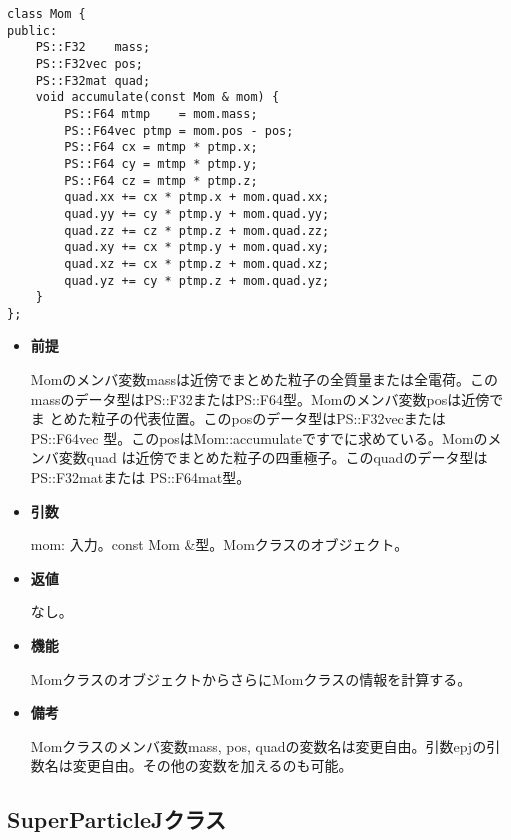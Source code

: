 \begin{screen}
\begin{verbatim}
class Mom {
public:
    PS::F32    mass;
    PS::F32vec pos;
    PS::F32mat quad;
    void accumulate(const Mom & mom) {
        PS::F64 mtmp    = mom.mass;
        PS::F64vec ptmp = mom.pos - pos;
        PS::F64 cx = mtmp * ptmp.x;
        PS::F64 cy = mtmp * ptmp.y;
        PS::F64 cz = mtmp * ptmp.z;
        quad.xx += cx * ptmp.x + mom.quad.xx;
        quad.yy += cy * ptmp.y + mom.quad.yy;
        quad.zz += cz * ptmp.z + mom.quad.zz;
        quad.xy += cx * ptmp.y + mom.quad.xy;
        quad.xz += cx * ptmp.z + mom.quad.xz;
        quad.yz += cy * ptmp.z + mom.quad.yz;
    }
};
\end{verbatim}
\end{screen}

\begin{itemize}

\item {\bf 前提}

  Momのメンバ変数massは近傍でまとめた粒子の全質量または全電荷。この
  massのデータ型はPS::F32またはPS::F64型。Momのメンバ変数posは近傍でま
  とめた粒子の代表位置。このposのデータ型はPS::F32vecまたはPS::F64vec
  型。このposはMom::accumulateですでに求めている。Momのメンバ変数quad
  は近傍でまとめた粒子の四重極子。このquadのデータ型はPS::F32matまたは
  PS::F64mat型。

\item {\bf 引数}

  mom: 入力。const Mom \&型。Momクラスのオブジェクト。
  
\item {\bf 返値}

  なし。

\item {\bf 機能}

  MomクラスのオブジェクトからさらにMomクラスの情報を計算する。
  
\item {\bf 備考}

  Momクラスのメンバ変数mass, pos, quadの変数名は変更自由。引数epjの引
  数名は変更自由。その他の変数を加えるのも可能。

\end{itemize}

\subsection{SuperParticleJクラス}
\label{sec:example_superparticlej}

